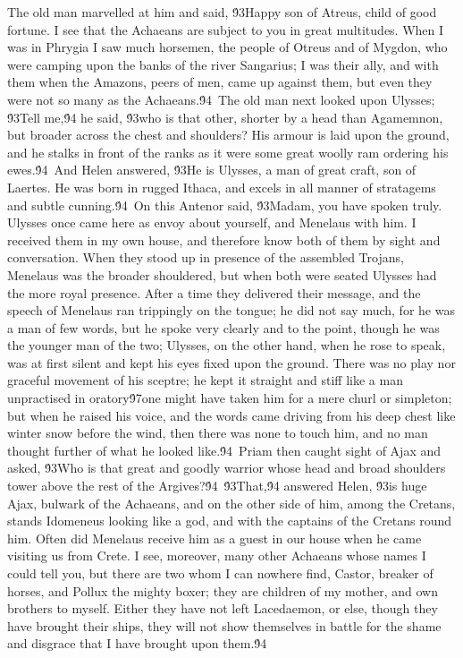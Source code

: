 {The old man marvelled at him and said, \'93Happy son of Atreus, child of good fortune. I see that the Achaeans are subject to you in great multitudes. When I was in Phrygia I saw much horsemen, the people of Otreus and of Mygdon, who were camping upon the banks of the river Sangarius; I was their ally, and with them when the Amazons, peers of men, came up against them, but even they were not so many as the Achaeans.\'94\
The old man next looked upon Ulysses; \'93Tell me,\'94 he said, \'93who is that other, shorter by a head than Agamemnon, but broader across the chest and shoulders? His armour is laid upon the ground, and he stalks in front of the ranks as it were some great woolly ram ordering his ewes.\'94\
And Helen answered, \'93He is Ulysses, a man of great craft, son of Laertes. He was born in rugged Ithaca, and excels in all manner of stratagems and subtle cunning.\'94\
On this Antenor said, \'93Madam, you have spoken truly. Ulysses once came here as envoy about yourself, and Menelaus with him. I received them in my own house, and therefore know both of them by sight and conversation. When they stood up in presence of the assembled Trojans, Menelaus was the broader shouldered, but when both were seated Ulysses had the more royal presence. After a time they delivered their message, and the speech of Menelaus ran trippingly on the tongue; he did not say much, for he was a man of few words, but he spoke very clearly and to the point, though he was the younger man of the two; Ulysses, on the other hand, when he rose to speak, was at first silent and kept his eyes fixed upon the ground. There was no play nor graceful movement of his sceptre; he kept it straight and stiff like a man unpractised in oratory\'97one might have taken him for a mere churl or simpleton; but when he raised his voice, and the words came driving from his deep chest like winter snow before the wind, then there was none to touch him, and no man thought further of what he looked like.\'94\
Priam then caught sight of Ajax and asked, \'93Who is that great and goodly warrior whose head and broad shoulders tower above the rest of the Argives?\'94\
\'93That,\'94 answered Helen, \'93is huge Ajax, bulwark of the Achaeans, and on the other side of him, among the Cretans, stands Idomeneus looking like a god, and with the captains of the Cretans round him. Often did Menelaus receive him as a guest in our house when he came visiting us from Crete. I see, moreover, many other Achaeans whose names I could tell you, but there are two whom I can nowhere find, Castor, breaker of horses, and Pollux the mighty boxer; they are children of my mother, and own brothers to myself. Either they have not left Lacedaemon, or else, though they have brought their ships, they will not show themselves in battle for the shame and disgrace that I have brought upon them.\'94\
}
